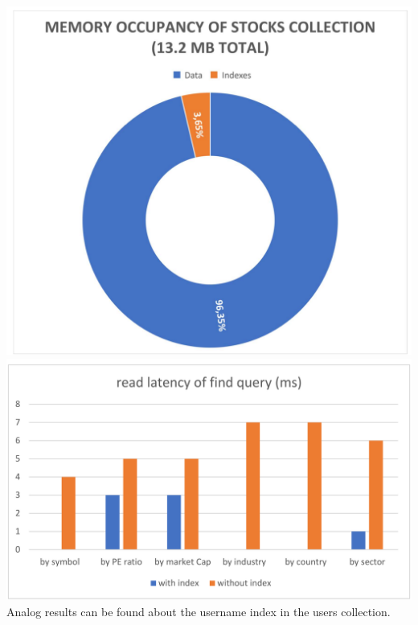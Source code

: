 \includegraphics[scale=0.11]{img/memory_mongo.png}
\includegraphics[scale=0.11]{img/latency_mongo.png}\\

Analog results can be found about the username index in the users collection.

